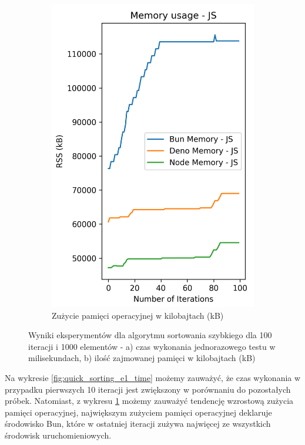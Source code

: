 \begin{figure}[H]
\begin{subfigure}[b]{0.42\textwidth}
    \includegraphics[width=\textwidth]{Figures/sorting/sorting_quick_100_1000_js_memory.png}
    \caption{Zużycie pamięci operacyjnej w kilobajtach (kB)}
    \label{fig:quick_sorting_e1_memory}
  \end{subfigure}
  \caption{Wyniki eksperymentów dla algorytmu sortowania szybkiego dla 100 iteracji i 1000 elementów - a) czas wykonania jednorazowego testu w milisekundach, b) ilość zajmowanej pamięci w kilobajtach (kB)}
  \label{fig:quick_sorting_e1}
\end{figure}

Na wykresie \ref{fig:quick_sorting_e1_time} możemy zauważyć, że czas wykonania w przypadku pierwszych 10 iteracji jest zwiększony w porównaniu do pozostałych próbek. Natomiast, z wykresu \ref{fig:quick_sorting_e1_memory} możemy zauważyć tendencję wzrostową zużycia pamięci operacyjnej, największym zużyciem pamięci operacyjnej deklaruje środowisko Bun, które w ostatniej iteracji zużywa najwięcej ze wszystkich środowisk uruchomieniowych.

